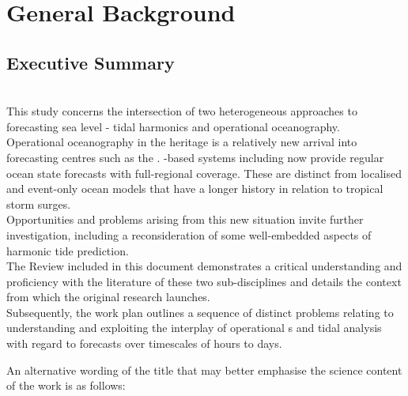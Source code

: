\newpage
\section{General Background}  \label{S:a} 

\subsection{Executive Summary}
\texttt{\TITLE{}}\\

This study concerns the intersection of two heterogeneous approaches to forecasting sea level - tidal harmonics and operational oceanography.\\



Operational oceanography in the \GODAE{} heritage is a relatively new arrival into forecasting centres such as the \BOM{}. \OGCM{}-based systems including \BL{} now provide regular ocean state forecasts with full-regional coverage.  These are distinct from localised and event-only ocean models that have a longer history in relation to tropical storm surges.\\
Opportunities and problems arising from this new situation invite further investigation, including a reconsideration of some well-embedded aspects of harmonic tide prediction.\\


The Review included in this document demonstrates a critical understanding and proficiency with the literature of these two sub-disciplines and details the context from which the original research launches.\\
Subsequently, the work plan outlines a sequence of distinct problems relating to understanding and exploiting the interplay of operational \OGCM{}s and tidal analysis with regard to forecasts over timescales of hours to days.

An alternative wording of the title that may better emphasise the science content of the work is as follows:  \texttt{\ALTTITLE{}}\\


